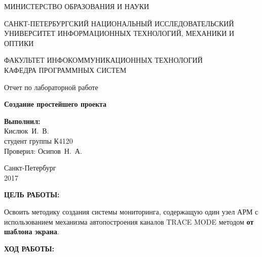 \documentclass[14pt,a4paper]{extreport}
\newcommand{\header}[1]{%
{
\clearpage%
\fontsize{16pt}{14pt}\selectfont
\begin{center}
\textbf{\MakeUppercase{#1}:}
\end{center}
}
}
\newcommand{\labyear}{2017}
\newcommand{\labtitle}{Создание простейшего проекта}
\newcommand{\prepod}{Осипов~Н.~А.}
\newcommand{\student}{Кислюк~И.~В.}
\begin{document}
	\begin{titlepage}
	\begin{center}	
		\fontsize{14pt}{14pt}\selectfont
		МИНИСТЕРСТВО ОБРАЗОВАНИЯ И НАУКИ\\

		\vspace*{0.6\baselineskip}

		\MakeUppercase{Санкт-Петербургский Национальный Исследовательский Университет Информационных технологий, механики и оптики}		
		
		\vspace*{0.6\baselineskip}
		\MakeUppercase{Факультет Инфокоммуникационных технологий}\\
		\MakeUppercase{Кафедра программных систем}
	
		\vspace*{7\baselineskip}
		\fontsize{19pt}{18pt}\selectfont
		Отчет по лабораторной работе
		
		\fontsize{20pt}{18pt}\selectfont
		\textbf{\labtitle}\\
		\vspace*{1.15\baselineskip}
		\end{center}
	
	\vspace*{2\baselineskip}
	\begin{flushright}
	\fontsize{14pt}{14pt}\selectfont
	\textbf{Выполнил:}\\
	\student\\
	студент группы К4120\\
	Проверил: \prepod\\
	\end{flushright}
	
	\vspace{\fill}
	\begin{center}
	Санкт-Петербург\\
	\vspace{-1ex}
	\labyear
	\end{center}
	
\end{titlepage}

\fontsize{14pt}{14pt}\selectfont

\header{Цель работы}


Освоить методику создания системы мониторинга, содержащую один узел АРМ с использованием механизма автопостроения каналов TRACE MODE методом \textbf{от шаблона экрана}.

\header{Ход работы}
\end{document}
